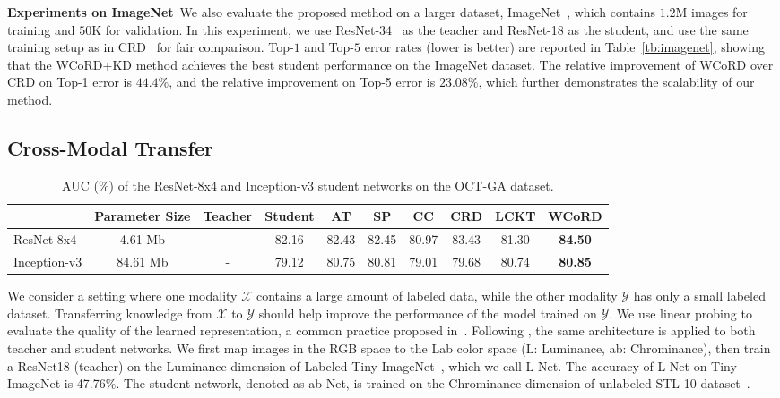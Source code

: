 \documentclass[final]{cvpr}
\newcommand{\Xcal}{\mathcal{X}}
\newcommand{\Ycal}{\mathcal{Y}}
\theoremstyle{definition}
\begin{document}
\vspace{5pt}
\noindent\textbf{Experiments on ImageNet}\,
We also evaluate the proposed method on a larger dataset,
ImageNet~\cite{deng2009imagenet}, which contains $1.2$M images for training and $50$K for validation.
In this experiment, we use ResNet-34~\cite{he2016deep} as the teacher and ResNet-18 as the student, and use the same training setup as in CRD~\cite{tian2019contrastive} for fair comparison.
Top-$1$ and Top-$5$ error rates (lower is better) are reported in Table~\ref{tb:imagenet}, showing that the 
WCoRD+KD method achieves the best student performance on the ImageNet dataset.
The relative improvement of WCoRD over CRD on Top-1 error is $44.4\%$, and the relative improvement on Top-5 error is $23.08\%$, which further
demonstrates the scalability of our method.





\subsection{Cross-Modal Transfer}


\begin{table*}[t!]
\small
\begin{center}
\begin{tabular}{l|c|cc|cccc|cc}
\toprule
 & Parameter Size  & Teacher & Student & AT & SP & CC & CRD & LCKT & WCoRD \\
\midrule
ResNet-8x4 & 4.61 Mb  & - & 82.16 & 82.43 &  82.45 & 80.97 & 83.43 & 81.30 & \textbf{84.50}\\
\hline 
Inception-v3 & 84.61 Mb & - & 79.12 & 80.75 &  80.81 & 79.01 & 79.68 & 80.74 & \textbf{80.85}\\
\bottomrule
\end{tabular}
\caption{
\small{AUC (\%) of the ResNet-8x4 and Inception-v3 student networks on the OCT-GA dataset.}
}
\label{tb:privilege}
\end{center}
\vspace{-5mm}
\end{table*}
 We consider a setting where one modality $\Xcal$ contains a large amount of labeled data, while the other modality $\Ycal$ has only a small labeled dataset. Transferring knowledge from $\Xcal$ to $\Ycal$ should help improve the performance of the model trained on $\Ycal$.
We use linear probing to evaluate the quality of the learned representation, a common practice proposed in~\cite{alain2016understanding, zhang2017split}. 
Following \cite{tian2019contrastive}, the same architecture is applied to both teacher and student networks. We first map images in the RGB space to the Lab color space (L: Luminance, ab: Chrominance), then train a ResNet18 (teacher) on the Luminance dimension of Labeled Tiny-ImageNet~\cite{deng2009imagenet}, which we call L-Net. The accuracy of L-Net on Tiny-ImageNet is 47.76$\%$. The student network, denoted as ab-Net, is trained on the Chrominance dimension of unlabeled STL-10 dataset~\cite{coates2011analysis}.
\end{document}
